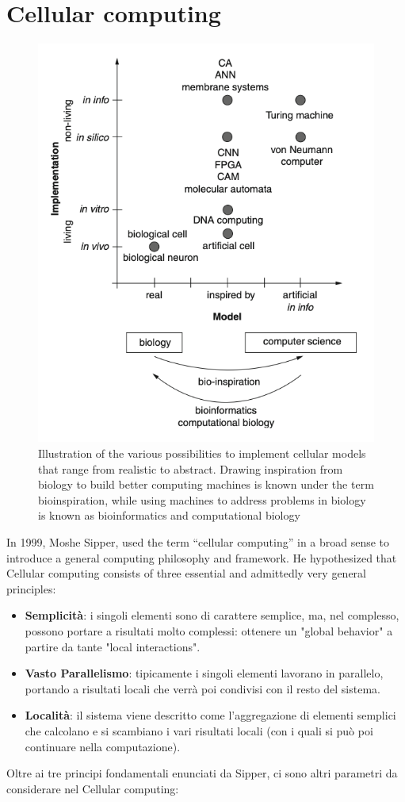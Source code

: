 \documentclass[12pt,a4paper]{report}
\begin{document}
\chapter{Cellular computing}
\begin{figure}[h]
	\centering
	\includegraphics[width=0.7\linewidth]{img/cellular computing}
	\caption{Illustration of the various possibilities to implement cellular models that range from realistic to abstract. Drawing inspiration from biology to build better computing machines is known under the term bioinspiration, while using machines to address problems in biology is known as bioinformatics and computational biology}
	\label{fig:5}
\end{figure}
In 1999, Moshe Sipper, used the term “cellular computing” in a broad sense to introduce a general computing philosophy and framework. He hypothesized that Cellular computing consists of three essential and admittedly very general principles:
\begin{itemize}
\item \textbf{Semplicità}: i singoli elementi sono di carattere semplice, ma, nel complesso, possono portare a risultati molto complessi: ottenere un "global behavior" a partire da tante "local interactions".
\item \textbf{Vasto Parallelismo}: tipicamente i singoli elementi lavorano in parallelo, portando a risultati locali che verrà poi condivisi con il resto del sistema.
\item \textbf{Località}: il sistema viene descritto come l'aggregazione di elementi semplici che calcolano e si scambiano i vari risultati locali (con i quali si può poi continuare nella computazione).
\end{itemize}
Oltre ai tre principi fondamentali enunciati da Sipper, ci sono altri parametri da considerare nel Cellular computing:
\end{document}
